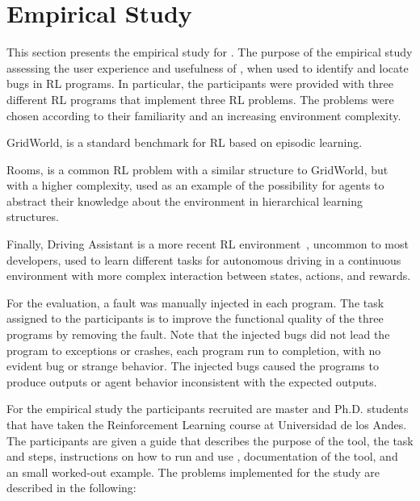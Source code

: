 
\section{Empirical Study}
\label{sec:evaluation}

This section presents the empirical study for \flik. The purpose of the empirical study assessing the 
user experience and usefulness of \flik, when used to identify and locate bugs in  \ac{RL} programs. 
In particular, the participants were provided with three different \ac{RL} programs that implement three 
\ac{RL} problems. The problems were chosen according to their familiarity and an increasing 
environment complexity. 
\begin{enumerate*}[label=(\arabic*)]
\item GridWorld, is a standard benchmark for \ac{RL} based on episodic learning.
\item Rooms, is a common \ac{RL} problem with a similar structure to GridWorld, but with a higher 
complexity, used as an example of the possibility for agents to abstract their knowledge about the 
environment in hierarchical learning~\cite{pateria21} structures. 
\item Finally, Driving Assistant is a more recent \ac{RL} environment~\cite{cardozo18ml4pl,cardozo23}, 
uncommon to most developers, used to learn different tasks for autonomous driving in a continuous 
environment with more complex interaction between states, actions, and rewards. 
\end{enumerate*}

For the evaluation, a fault was manually injected in each program. The task assigned to the 
participants is to improve the functional quality of the three programs by removing the fault. Note that 
the injected bugs did not lead the program to exceptions or crashes, \ie each program run to 
completion, with no evident bug or strange behavior. The injected bugs caused the programs to 
produce outputs or agent behavior inconsistent with the expected outputs. 

For the empirical study the participants recruited are master and Ph.D. students that have taken the 
Reinforcement Learning course at Universidad de los Andes.  The participants are given a guide that 
describes the purpose of the tool, the task and steps, instructions on how to run and 
use \flik, documentation of the tool, and an small worked-out example. The problems implemented for 
the study are described in the following:

